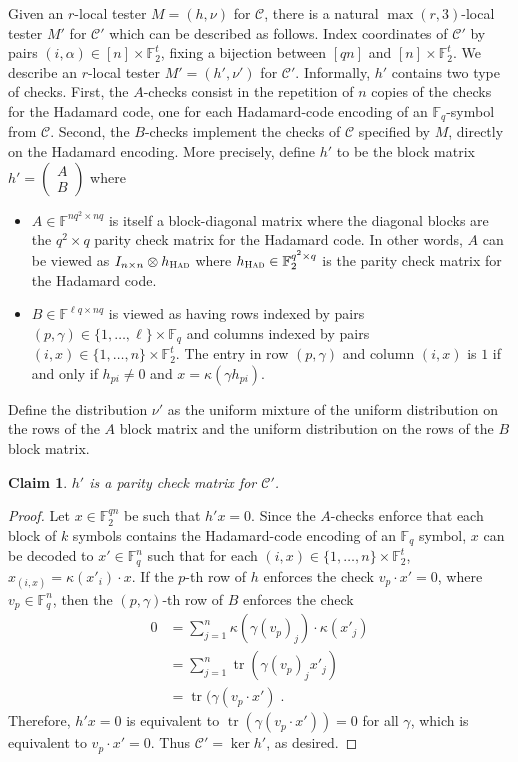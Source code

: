 \documentclass[11pt]{article}
\newtheorem{claim}[theorem]{Claim}
\theoremstyle{definition}
\newcommand{\code}{\mathscr{C}}
\newcommand{\F}{\ensuremath{\mathbb{F}}}
\newcommand{\had}{\textsc{Had}}
\DeclareMathOperator{\tr}{tr}
\begin{document}
Given an $r$-local tester $M=(h,\nu)$ for $\code$, there is a natural $\max(r,3)$-local tester $M'$ for $\code'$ which can be described as follows. Index coordinates of $\code'$ by pairs $(i,\alpha)\in [n]\times\F_2^t$, fixing a bijection between $[qn]$ and $[n]\times \F_2^t$.  We describe an $r$-local tester $M' = (h',\nu')$ for $\code'$. Informally, $h'$ contains two type of checks. First, the $A$-checks consist in the repetition of $n$ copies of the checks for the Hadamard code, one for each Hadamard-code encoding of an $\F_q$-symbol from $\code$. Second, the $B$-checks implement the checks of $\code$ specified by $M$, directly on the Hadamard encoding. More precisely, define $h'$ to be the block matrix $h'=\begin{pmatrix} A \\ B \end{pmatrix}$ where 
\begin{itemize}
	\item $A \in \F^{nq^2 \times nq}$ is itself a block-diagonal matrix where the diagonal blocks are the $q^2 \times q$ parity check matrix for the Hadamard code. 
	In other words, $A$ can be viewed as $I_{n\times n} \otimes h_\had$ where $h_\had \in \F_2^{q^2 \times q}$ is the parity check matrix for the Hadamard code. 
	\item $B \in \F^{\ell q \times nq}$ is viewed as having rows indexed by pairs $(p,\gamma) \in \{1,\ldots,\ell\} \times \F_q$ and columns indexed by pairs $(i,x) \in \{1,\ldots,n\} \times \F_2^t$. The entry in row $(p,\gamma)$ and column $(i,x)$ is $1$ if and only if $h_{pi} \neq 0$ and $x = \kappa(\gamma h_{pi})$.
\end{itemize}
Define the distribution $\nu'$ as the uniform mixture of the uniform distribution on the rows of the $A$ block matrix and the uniform distribution on the rows of the $B$ block matrix. 

\begin{claim}
$h'$ is a parity check matrix for $\code'$.
\end{claim}

\begin{proof}
Let $x\in \F_2^{qn}$ be such that $h'x=0$. Since the $A$-checks enforce that each block of $k$ symbols contains the Hadamard-code encoding of an $\F_q$ symbol, $x$ can be decoded to $x'\in \F_q^n$ such that for each $(i,x)\in \{1,\ldots,n\}\times \F_2^t$, $x_{(i,x)} = \kappa(x'_i)\cdot x$. If the $p$-th row of $h$ enforces the check $v_p\cdot x'=0$, where $v_p\in \F_q^n$, then 
the $(p,\gamma)$-th row of $B$ enforces the check 
\begin{align*}
0&=\sum_{j=1}^n \kappa(\gamma (v_p)_j) \cdot \kappa(x'_j)\\
&= \sum_{j=1}^n \tr( \gamma (v_p)_j x'_j) \\
&= \tr(\gamma (v_p\cdot  x')\;.
\end{align*}
Therefore, $h'x=0$ is equivalent to $\tr(\gamma(v_p \cdot x'))=0$ for all $\gamma$, which is equivalent to $v_p\cdot x'=0$. Thus $\code'=\ker h'$, as desired. 
\end{proof}
\end{document}
